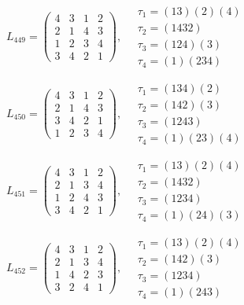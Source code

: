 $L_{449} = \begin{pmatrix} 4 & 3 & 1 & 2 \\ 2 & 1 & 4 & 3 \\ 1 & 2 & 3 & 4 \\ 3 & 4 & 2 & 1 \end{pmatrix}, \quad \begin{matrix} \tau_{1} = (1 3)(2)(4) \\ \tau_{2} = (1 4 3 2) \\ \tau_{3} = (1 2 4)(3) \\ \tau_{4} = (1)(2 3 4) \end{matrix}$

$L_{450} = \begin{pmatrix} 4 & 3 & 1 & 2 \\ 2 & 1 & 4 & 3 \\ 3 & 4 & 2 & 1 \\ 1 & 2 & 3 & 4 \end{pmatrix}, \quad \begin{matrix} \tau_{1} = (1 3 4)(2) \\ \tau_{2} = (1 4 2)(3) \\ \tau_{3} = (1 2 4 3) \\ \tau_{4} = (1)(2 3)(4) \end{matrix}$

$L_{451} = \begin{pmatrix} 4 & 3 & 1 & 2 \\ 2 & 1 & 3 & 4 \\ 1 & 2 & 4 & 3 \\ 3 & 4 & 2 & 1 \end{pmatrix}, \quad \begin{matrix} \tau_{1} = (1 3)(2)(4) \\ \tau_{2} = (1 4 3 2) \\ \tau_{3} = (1 2 3 4) \\ \tau_{4} = (1)(2 4)(3) \end{matrix}$

$L_{452} = \begin{pmatrix} 4 & 3 & 1 & 2 \\ 2 & 1 & 3 & 4 \\ 1 & 4 & 2 & 3 \\ 3 & 2 & 4 & 1 \end{pmatrix}, \quad \begin{matrix} \tau_{1} = (1 3)(2)(4) \\ \tau_{2} = (1 4 2)(3) \\ \tau_{3} = (1 2 3 4) \\ \tau_{4} = (1)(2 4 3) \end{matrix}$

